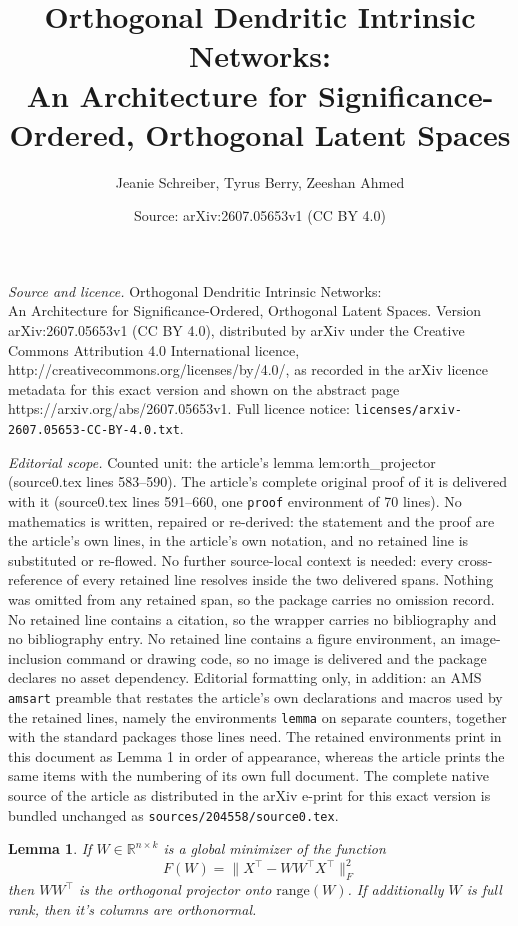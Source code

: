 \documentclass[10pt,a4paper]{amsart}
\title{Orthogonal Dendritic Intrinsic Networks: \\ An Architecture for Significance-Ordered, Orthogonal Latent Spaces}
\author{Jeanie Schreiber, Tyrus Berry, Zeeshan Ahmed}
\date{Source: arXiv:2607.05653v1 (CC BY 4.0)}
\newtheorem{lemma}{Lemma}
\begin{document}
\maketitle

\noindent\emph{Source and licence.} Orthogonal Dendritic Intrinsic Networks: \\ An Architecture for Significance-Ordered, Orthogonal Latent Spaces. Version arXiv:2607.05653v1 (CC BY 4.0), distributed by arXiv under the Creative Commons Attribution 4.0 International licence, http://creativecommons.org/licenses/by/4.0/, as recorded in the arXiv licence metadata for this exact version and shown on the abstract page https://arxiv.org/abs/2607.05653v1. Full licence notice: \texttt{licenses/arxiv-2607.05653-CC-BY-4.0.txt}.\par\smallskip

\noindent\textit{Editorial scope.} Counted unit: the article's lemma lem:orth\_projector (source0.tex lines 583--590). The article's complete original proof of it is delivered with it (source0.tex lines 591--660, one \texttt{proof} environment of 70 lines). No mathematics is written, repaired or re-derived: the statement and the proof are the article's own lines, in the article's own notation, and no retained line is substituted or re-flowed.  No further source-local context is needed: every cross-reference of every retained line resolves inside the two delivered spans.  Nothing was omitted from any retained span, so the package carries no omission record.  No retained line contains a citation, so the wrapper carries no bibliography and no bibliography entry.  No retained line contains a figure environment, an image-inclusion command or drawing code, so no image is delivered and the package declares no asset dependency.  Editorial formatting only, in addition: an AMS \texttt{amsart} preamble that restates the article's own declarations and macros used by the retained lines, namely the environments \texttt{lemma} on separate counters, together with the standard packages those lines need.  The retained environments print in this document as Lemma 1 in order of appearance, whereas the article prints the same items with the numbering of its own full document.  The complete native source of the article as distributed in the arXiv e-print for this exact version is bundled unchanged as \texttt{sources/204558/source0.tex}.
\begin{lemma}
\label{lem:orth_projector}
    If $W \in \mathbb{R}^{n\times k}$ is a global minimizer of the function
\[
    F(W)=\|X^\top-WW^\top X^\top\|_F^2
\] then $WW^\top$ is the orthogonal projector onto $\mathrm{range}(W)$. If additionally $W$ is full rank, then it's columns are orthonormal.
\label{lem:projection}
\end{lemma}
\end{document}
